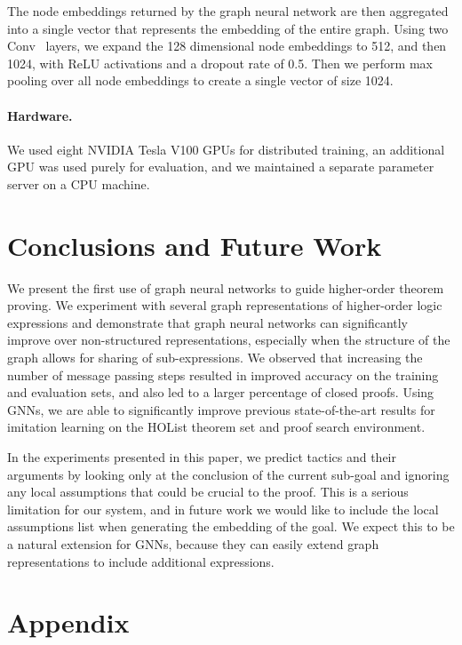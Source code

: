 \documentclass[letterpaper]{article} \usepackage{aaai20}  \usepackage{times}  \usepackage{helvet} \usepackage{courier}  \usepackage[hyphens]{url}  \usepackage{graphicx} \urlstyle{rm} \def\UrlFont{\rm}  \usepackage{graphicx}  \frenchspacing  \setlength{\pdfpagewidth}{8.5in}  \setlength{\pdfpageheight}{11in}
\begin{document}
The node embeddings  returned by the graph neural network are then aggregated into a single vector that represents the embedding of the entire graph.
Using two Conv~ layers, we expand the 128 dimensional node embeddings to 512, and then 1024, with ReLU activations and a dropout rate of 0.5. Then we perform max pooling over all node embeddings to create a single vector of size 1024.

\paragraph{Hardware.}
We used eight NVIDIA Tesla V100 GPUs for distributed training, an additional GPU was used purely for evaluation, and we maintained a separate parameter server on a CPU machine.
 \section{Conclusions and Future Work}
\label{sec:conclusion}

We present the first use of graph neural networks to guide higher-order theorem proving. We experiment with several graph representations of higher-order logic expressions and demonstrate that graph neural networks can significantly improve over non-structured representations, especially when the structure of the graph allows for sharing of sub-expressions. 
We observed that increasing the number of message passing steps resulted in improved accuracy on the training and evaluation sets, and also led to a larger percentage of closed proofs.
Using GNNs, we are able to significantly improve previous state-of-the-art results for imitation learning on the HOList theorem set and proof search environment.

In the experiments presented in this paper, we predict tactics and their arguments by looking only at the conclusion of the current sub-goal and ignoring any local assumptions that could be crucial to the proof.
This is a serious limitation for our system, and in future work we would like to include the local assumptions list when generating the embedding of the goal.
We expect this to be a natural extension for GNNs, because they can easily extend graph representations to include additional expressions.
 





\clearpage
\appendix
\section{Appendix}
\end{document}
